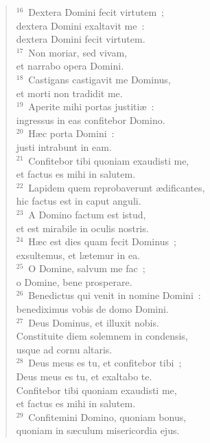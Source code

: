 \begin{flushleft}
\begin{verse}
${}^{16}$~Dextera Domini fecit virtutem~;\\ dextera Domini exaltavit me~:\\ dextera Domini fecit virtutem.\\
${}^{17}$~Non moriar, sed vivam,\\ et narrabo opera Domini.\\
${}^{18}$~Castigans castigavit me Dominus,\\ et morti non tradidit me.\\
${}^{19}$~Aperite mihi portas justiti\ae~:\\ ingressus in eas confitebor Domino.\\
${}^{20}$~H\ae c porta Domini~:\\ justi intrabunt in eam.\\
${}^{21}$~Confitebor tibi quoniam exaudisti me,\\ et factus es mihi in salutem.\\
${}^{22}$~Lapidem quem reprobaverunt \ae dificantes,\\ hic factus est in caput anguli.\\
${}^{23}$~A Domino factum est istud,\\ et est mirabile in oculis nostris.\\
${}^{24}$~H\ae c est dies quam fecit Dominus~;\\ exsultemus, et l\ae temur in ea.\\
${}^{25}$~O Domine, salvum me fac~;\\ o Domine, bene prosperare.\\
${}^{26}$~Benedictus qui venit in nomine Domini~:\\ benediximus vobis de domo Domini.\\
${}^{27}$~Deus Dominus, et illuxit nobis.\\ Constituite diem solemnem in condensis,\\ usque ad cornu altaris.\\
${}^{28}$~Deus meus es tu, et confitebor tibi~;\\ Deus meus es tu, et exaltabo te.\\ Confitebor tibi quoniam exaudisti me,\\ et factus es mihi in salutem.\\
${}^{29}$~Confitemini Domino, quoniam bonus,\\ quoniam in s\ae culum misericordia ejus.\end{verse}\end{flushleft}


